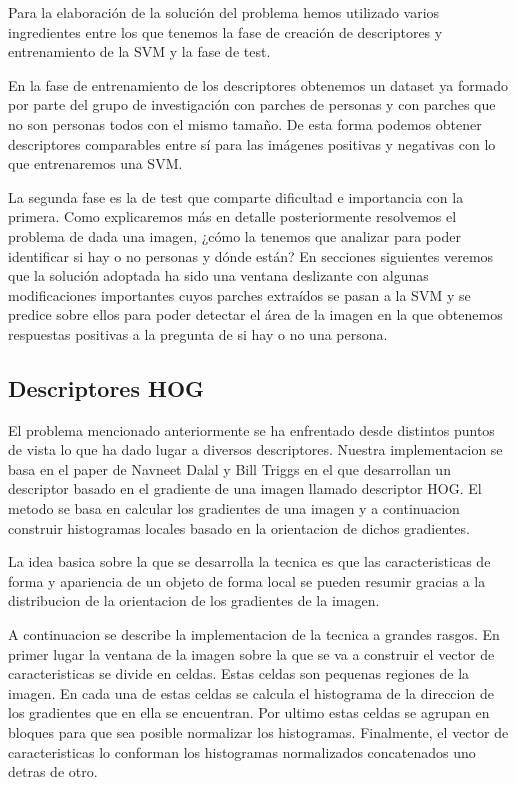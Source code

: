 \documentclass[a4paper,12pt]{article}
\begin{document}
Para la elaboración de la solución del problema hemos utilizado varios ingredientes entre los que tenemos la fase de creación de descriptores y entrenamiento de la SVM y la fase de test.

En la fase de entrenamiento de los descriptores obtenemos un dataset ya formado por parte del grupo de investigación con parches de personas y con parches que no son personas todos con el mismo tamaño. De esta forma podemos obtener descriptores comparables entre sí para las imágenes positivas y negativas con lo que entrenaremos una SVM.

La segunda fase es la de test que comparte dificultad e importancia con la primera. Como explicaremos más en detalle posteriormente resolvemos el problema de dada una imagen, ¿cómo la tenemos que analizar para poder identificar si hay o no personas y dónde están? En secciones siguientes veremos que la solución adoptada ha sido una ventana deslizante con algunas modificaciones importantes cuyos parches extraídos se pasan a la SVM y se predice sobre ellos para poder detectar el área de la imagen en la que obtenemos respuestas positivas a la pregunta de si hay o no una persona.

\subsection{Descriptores HOG}

El problema mencionado anteriormente se ha enfrentado desde
distintos puntos de vista lo que ha dado lugar a diversos
descriptores. Nuestra implementacion se basa en el paper de
Navneet Dalal y Bill Triggs en el que desarrollan un descriptor
basado en el gradiente de una imagen llamado descriptor HOG.
El metodo se basa en calcular los gradientes de una imagen y a
continuacion construir histogramas locales basado en la
orientacion de dichos gradientes.

La idea basica sobre la que se desarrolla la tecnica es que las
caracteristicas de forma y apariencia de un objeto de forma local
se pueden resumir gracias a la distribucion de la orientacion de
los gradientes de la imagen.

A continuacion se describe la implementacion de la tecnica a
grandes rasgos. En primer lugar la ventana de la imagen sobre la
que se va a construir el vector de caracteristicas se divide en
celdas. Estas celdas son pequenas regiones de la imagen. En cada
una de estas celdas se calcula el histograma de la direccion de
los gradientes que en ella se encuentran. Por ultimo estas
celdas se agrupan en bloques para que sea posible normalizar los
histogramas. Finalmente, el vector de caracteristicas lo conforman
los histogramas normalizados concatenados uno detras de otro.
\end{document}
